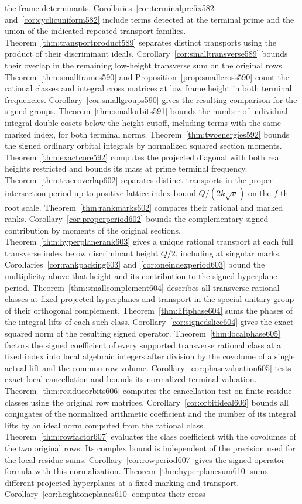 \documentclass[a4paper,11pt]{article}
\theoremstyle{definition}
\theoremstyle{remark}
\numberwithin{equation}{section}
\begin{document}
the frame determinants. Corollaries~\ref{cor:terminalprefix582} and~\ref{cor:cyclicuniform582} include terms detected at the terminal prime and the union of the indicated repeated-transport families. Theorem~\ref{thm:transportproduct589} separates distinct transports using the product of their discriminant ideals. Corollary~\ref{cor:smalltransverse589} bounds their overlap in the remaining low-height transverse sum on the original rows. Theorem~\ref{thm:smallframes590} and Proposition~\ref{prop:smallcross590} count the rational classes and integral cross matrices at low frame height in both terminal frequencies. Corollary~\ref{cor:smallgroups590} gives the resulting comparison for the signed groups. Theorem~\ref{thm:smallorbits591} bounds the number of individual integral double cosets below the height cutoff, including terms with the same marked index, for both terminal norms. Theorem~\ref{thm:twoenergies592} bounds the signed ordinary orbital integrals by normalized squared section moments. Theorem~\ref{thm:exactcore592} computes the projected diagonal with both real heights restricted and bounds its mass at prime terminal frequency. Theorem~\ref{thm:traceoverlap602} separates distinct transports in the proper-intersection period up to positive lattice index bound \(Q/(2k\sqrt u)\) on the \(f\)-th root scale. Theorem~\ref{thm:rankmarks602} compares their rational and marked ranks. Corollary~\ref{cor:properperiod602} bounds the complementary signed contribution by moments of the original sections. Theorem~\ref{thm:hyperplanerank603} gives a unique rational transport at each full transverse index below discriminant height \(Q/2\), including at singular marks. Corollaries~\ref{cor:rankpacking603} and~\ref{cor:oneindexperiod603} bound the multiplicity above that height and its contribution to the signed hyperplane period. Theorem~\ref{thm:smallcomplement604} describes all transverse rational classes at fixed projected hyperplanes and transport in the special unitary group of their orthogonal complement. Theorem~\ref{thm:liftphase604} sums the phases of the integral lifts of each such class. Corollary~\ref{cor:signedslice604} gives the exact squared norm of the resulting signed operator. Theorem~\ref{thm:localphase605} factors the signed coefficient of every supported transverse rational class at a fixed index into local algebraic integers after division by the covolume of a single actual lift and the common row volume. Corollary~\ref{cor:phasevaluation605} tests exact local cancellation and bounds its normalized terminal valuation. Theorem~\ref{thm:residueorbits606} computes the cancellation test on finite residue classes using the original row matrices. Corollary~\ref{cor:orbitideal606} bounds all conjugates of the normalized arithmetic coefficient and the number of its integral lifts by an ideal norm computed from the rational class. Theorem~\ref{thm:rowfactor607} evaluates the class coefficient with the covolumes of the two original rows. Its complex bound is independent of the precision used for the local residue sums. Corollary~\ref{cor:rowperiod607} gives the signed operator formula with this normalization. Theorem~\ref{thm:hyperplanesum610} sums different projected hyperplanes at a fixed marking and transport. Corollary~\ref{cor:heightoneplanes610} computes their cross 
\end{document}
